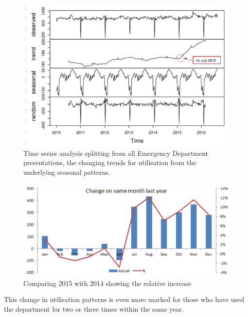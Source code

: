 \documentclass[11pt,a4paper]{article}
\begin{document}
\begin{figure}[htp]
\centering
\includegraphics[scale=0.60]{TS_ED.png}
\caption{Time series analysis splitting from all Emergency Department presentations, the changing trends for utilisation from the underlying seasonal patterns.}
\label{Time series analysis of Emergency Department presentations}
\end{figure}

\begin{figure}[htp]
\centering
\includegraphics[scale=0.35]{ED.png}
\caption{Comparing 2015 with 2014 showing the relative increase}
\label{Relative changes in ED utilization}
\end{figure}

This change in utilisation patterns is even more marked for those who have used the department for two or three times within the same year.\\
\end{document}
